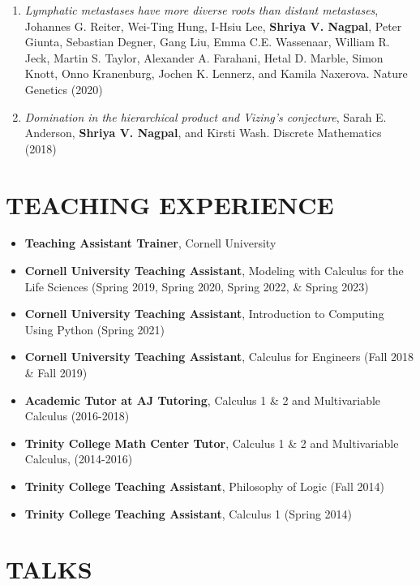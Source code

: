 \documentclass[margin]{res} %
\begin{document}
\begin{resume}
\begin{enumerate}
    \item {\sl Lymphatic metastases have more diverse roots than distant metastases}, Johannes G. Reiter, Wei-Ting Hung, I-Hsiu Lee, \textbf{Shriya V. Nagpal}, Peter Giunta, Sebastian Degner, Gang Liu, Emma C.E. Wassenaar, William R. Jeck, Martin S. Taylor, Alexander A. Farahani, Hetal D. Marble, Simon Knott, Onno Kranenburg, Jochen K. Lennerz, and Kamila Naxerova. Nature Genetics (2020)

    \item {\sl Domination in the hierarchical product and Vizing’s conjecture}, Sarah E. Anderson, \textbf{Shriya V. Nagpal}, and Kirsti Wash. Discrete Mathematics (2018)
\end{enumerate}


\section{TEACHING EXPERIENCE}

\begin{itemize}
    \item \textbf{Teaching Assistant Trainer}, Cornell University
    \item \textbf{Cornell University Teaching Assistant}, Modeling with Calculus for the Life Sciences (Spring 2019, Spring 2020, Spring 2022, \&  Spring 2023)
    \item \textbf{Cornell University Teaching Assistant}, Introduction to Computing Using Python (Spring 2021)
    \item \textbf{Cornell University Teaching Assistant}, Calculus for Engineers (Fall 2018 \& Fall 2019) 
    \item \textbf{Academic Tutor at AJ Tutoring}, Calculus 1 \& 2 and Multivariable Calculus (2016-2018)
    \item \textbf{Trinity College Math Center Tutor}, Calculus 1 \& 2 and Multivariable Calculus, (2014-2016)
    \item \textbf{Trinity College Teaching Assistant}, Philosophy of Logic (Fall 2014)
    \item \textbf{Trinity College Teaching Assistant}, Calculus 1 (Spring 2014)
\end{itemize}



\section{TALKS}

\end{resume}
\end{document}
